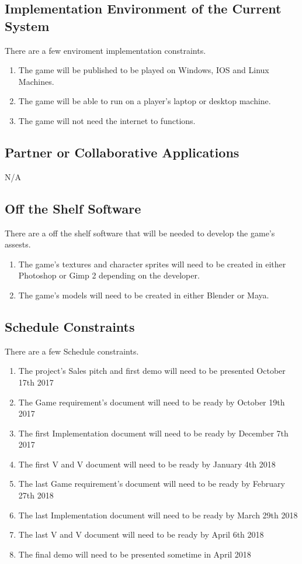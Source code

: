 \documentclass{article}
\begin{document}
\subsection{Implementation Environment of the Current System}
\quad There are a few enviroment implementation constraints.
\begin{enumerate}[{IE}1. ]
	\item The game will be published to be played on Windows, IOS and Linux Machines.
	\item The game will be able to run on a player's laptop or desktop machine. 
	\item The game will not need the internet to functions.
\end{enumerate}
\subsection{Partner or Collaborative Applications}
N/A
\subsection{Off the Shelf Software}
\quad There are a off the shelf software that will be needed to develop the game's assests.
\begin{enumerate}[{OSS}1. ]
	\item The game's textures and character sprites will need to be created in either Photoshop or Gimp 2 depending on the developer.
	\item The game's models will need to be created in either Blender or Maya.
\end{enumerate}
\subsection{Schedule Constraints}
\quad There are a few Schedule constraints.
\begin{enumerate}[{SC}1. ]
	\item The project's  Sales pitch and first demo will need to be presented October 17th 2017
	\item The Game requirement's document will need to be ready by October 19th 2017
	\item The first Implementation document will need to be ready by December 7th 2017
	\item The first V and V document will need to be ready by January 4th 2018
	\item The last Game requirement's document will need to be ready by February 27th 2018
	\item The last Implementation document will need to be ready by March 29th 2018
	\item The last V and V document will need to be ready by April 6th 2018
	\item The final demo will need to be presented sometime in April 2018
\end{enumerate}
\end{document}
